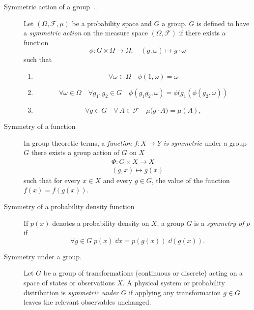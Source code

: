 \begin{description}
\item [Symmetric action of a group~\cite{luzzatto_chapter_2006}.]
Let $(\Omega,\mathcal{F},\mu)$ be a probability space and $G$ a group.  \(G\) is defined to have a \emph{symmetric action} on the measure space $(\Omega,\mathcal{F})$ if there exists a function
\[
    \phi: G \times \Omega \to\Omega,\quad (g,\omega)\mapsto g\cdot\omega
\]
such that
\begin{enumerate}
  \item \[\forall\omega \in\Omega\quad\phi(1, \omega) = \omega\]
  \item \[\forall\omega\in\Omega\quad\forall g_1, g_2\in G\quad \phi(g_1g_2, \omega) = \phi(g_1 (\phi (g_2, \omega))\]
  \item 
\[
    \forall g\in G\quad\forall\,A\in\mathcal{F}\quad\mu\bigl(g\cdot A\bigr)=\mu(A),
\]
\end{enumerate}

\item [Symmetry of a function]
        In group theoretic terms, a \emph{function \(f: X\to Y\) is symmetric} under a group \(G\) there exists a group action of \(G\) on \(X\) 
        \[
        \begin{split}
            \Phi: G\times X\to X\\
                (g, x) \mapsto g(x)
        \end{split}\]
       such that for every $x \in X$ and every $g \in G$, the value of the function \(f(x) = f(g(x))\).

\item [Symmetry of a probability density function]
    If $p(x)$ denotes a probability density on $X$, a group $G$ is a \emph{symmetry of \(p\)} if
    \[
        \forall g \in G \; p(x) \; \dd x = p(g(x)) \; \dd(g(x)).
    \]

\item [Symmetry under a group.]
    Let $G$ be a group of transformations (continuous or discrete) acting on a space of states or observations $X$.
    A physical system or probability distribution is \emph{symmetric under $G$} if applying any transformation $g \in G$ leaves the relevant observables unchanged.


\end{description}
